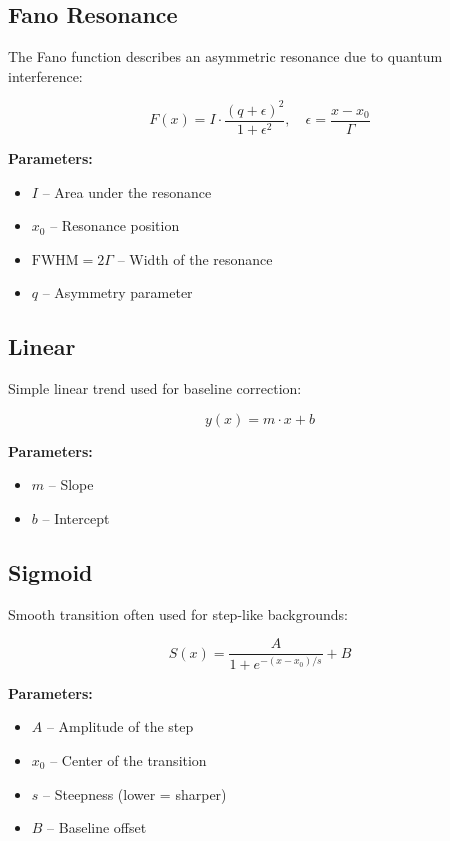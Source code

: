 \subsection{Fano Resonance}
The Fano function describes an asymmetric resonance due to quantum interference:

\begin{equation}
F(x) = I \cdot \frac{(q + \epsilon)^2}{1 + \epsilon^2}, \quad \epsilon = \frac{x - x_0}{\Gamma}
\end{equation}

\textbf{Parameters:}
\begin{itemize}
\item $I$ – Area under the resonance
\item $x_0$ – Resonance position
\item $\mathrm{FWHM} = 2\Gamma$ – Width of the resonance
\item $q$ – Asymmetry parameter
\end{itemize}

\subsection{Linear}
Simple linear trend used for baseline correction:

\begin{equation}
y(x) = m \cdot x + b
\end{equation}

\textbf{Parameters:}
\begin{itemize}
\item $m$ – Slope
\item $b$ – Intercept
\end{itemize}

\subsection{Sigmoid}
Smooth transition often used for step-like backgrounds:

\begin{equation}
S(x) = \frac{A}{1 + e^{-(x - x_0)/s}} + B
\end{equation}

\textbf{Parameters:}
\begin{itemize}
\item $A$ – Amplitude of the step
\item $x_0$ – Center of the transition
\item $s$ – Steepness (lower = sharper)
\item $B$ – Baseline offset
\end{itemize}

